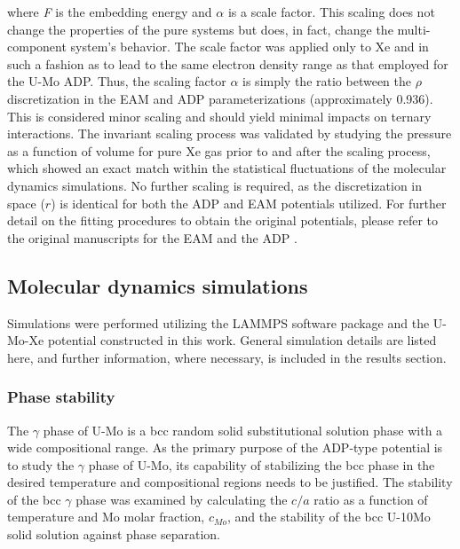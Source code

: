 \documentclass[review]{elsarticle}
\begin{document}
\noindent where \textit{F} is the embedding energy and $\alpha$ is a scale factor. This scaling does not change the properties of the pure systems but does, in fact, change the multi-component system's behavior. The scale factor was applied only to Xe and in such a fashion as to lead to the same electron density range as that employed for the U-Mo ADP. Thus, the scaling factor $\alpha$ is simply the ratio between the $\rho$ discretization in the EAM and ADP parameterizations (approximately 0.936). This is considered minor scaling and should yield minimal impacts on ternary interactions. The invariant scaling process was validated by studying the pressure as a function of volume for pure Xe gas prior to and after the scaling process, which showed an exact match within the statistical fluctuations of the molecular dynamics simulations. No further scaling is required, as the discretization in space ($r$) is identical for both the ADP and EAM potentials utilized. For further detail on the fitting procedures to obtain the original potentials, please refer to the original manuscripts for the EAM \cite{smirnovaUMoXe} and the ADP \cite{starikov2018}.

\subsection{Molecular dynamics simulations}

Simulations were performed utilizing the LAMMPS \cite{plimpton1995} software package and the U-Mo-Xe potential constructed in this work. General simulation details are listed here, and further information, where necessary, is included in the results section. 

\subsubsection{Phase stability}
The $\gamma$ phase of U-Mo is a bcc random solid substitutional solution phase with a wide compositional range. As the primary purpose of the ADP-type potential is to study the $\gamma$ phase of U-Mo, its capability of stabilizing the bcc phase in the desired temperature and compositional regions needs to be justified. The stability of the bcc $\gamma$ phase was examined by calculating the $c/a$ ratio as a function of temperature and Mo molar fraction, $c_{Mo}$, and the stability of the bcc U-10Mo solid solution against phase separation.
\end{document}
